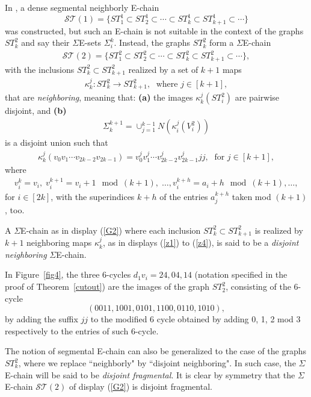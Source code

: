 \documentclass[12pt,reqno]{article}
\begin{document}
In \cite{D73}, a dense segmental neighborly E-chain
$${\mathcal{ST}}(1)=\{ST^1_1\subset ST^1_2\subset\cdots\subset ST^1_k\subset ST^1_{k+1}\subset\cdots\}$$
was constructed, but such an E-chain is not suitable in the context of the graphs $ST^2_k$ and say their $\Sigma$E-sets $\Sigma_i^k$. Instead, 
the graphs $ST^2_k$ form a $\Sigma$E-chain
\begin{eqnarray}\label{G2}{\mathcal{ST}}(2)=\{ST^2_1\subset ST^2_2\subset\cdots\subset ST^2_k\subset ST^2_{k+1}\subset\cdots\},\end{eqnarray}
with the inclusions $ST^2_k\subset ST^2_{k+1}$ realized by a set of $k+1$ maps
\begin{eqnarray}\label{z1}\kappa_k^j:ST^2_k\rightarrow ST^2_{k+1},\;\mbox{ where }j\in[k+1],\end{eqnarray}  that are {\it neighboring}, meaning that: {\bf(a)} the images $\kappa_k^j(ST^2_i)$ are pairwise disjoint, and {\bf(b)}
\begin{eqnarray}\label{z2}\Sigma_k^{k+1}=\cup_{j=1}^{k-1}N(\kappa_i^j(V^2_i))\end{eqnarray} is a disjoint union such that \begin{eqnarray}\label{z3}\kappa_k^j(v_0v_1\cdots v_{2k-2}v_{2k-1})=v^j_0v^j_1\cdots v^j_{2k-2}v^j_{2k-1}jj,\;\mbox{ for }j\in[k+1],\end{eqnarray}
where 
\begin{eqnarray}\label{z4}v^k_i=v_i,\; v^{k+1}_i=v_i+1\!\mod(k+1),\; \ldots, v^{k+h}_i=a_i+h\!\mod(k+1), \ldots,\end{eqnarray} for $i\in[2k]$, with the superindices $k+h$ of the entries $a^{k+h}_j$ taken mod $(k+1)$, too.

A $\Sigma$E-chain as in display (\ref{G2}) where each inclusion $ST^2_k\subset ST^2_{k+1}$ is realized by $k+1$ neighboring maps $\kappa_k^j$, as in displays (\ref{z1}) to (\ref{z4}), is said to be a
{\it disjoint neighboring} $\Sigma$E-chain. 

\begin{example}
In Figure~\ref{fig4}, the three 6-cycles $d_1v_i=24, 04, 14$ (notation specified in the proof of Theorem~\ref{cutout}) are the images of the graph $ST_2^2$, consisting of the 6-cycle $$(0011,1001,0101,1100,0110,1010),$$ by
adding the suffix $jj$ to the modified 6 cycle obtained by adding 0, 1, 2 mod 3 respectively to the entries of such 6-cycle.   
\end{example}

The notion of segmental E-chain can also be generalized to the case of the graphs $ST^2_k$, where we replace ``neighborly" by ``disjoint neighboring". In such case, the $\Sigma$E-chain will be said to be {\it disjoint fragmental}. It is clear by symmetry that the $\Sigma$E-chain ${\mathcal{ST}}(2)$ of display (\ref{G2}) is disjoint fragmental. 
\end{document}
